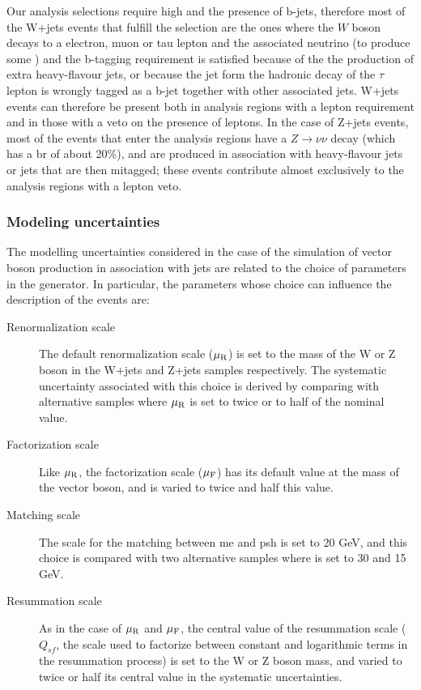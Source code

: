 Our analysis selections require high \met and the presence of b-jets, therefore most of the W+jets events that fulfill the selection are the ones where the $W$ boson decays to a electron, muon or tau lepton 
and the associated neutrino (to produce some \met) and the b-tagging requirement is satisfied because of the the production of extra heavy-flavour jets, or because the jet form the hadronic decay of the $\tau$
lepton is wrongly tagged as a b-jet together with other associated jets. 
W+jets events can therefore be present both in analysis regions with a lepton requirement and in those with a veto on the presence of leptons. 
In the case of Z+jets events, most of the events that enter the analysis regions have a $Z \to \nu \nu$ decay (which has a \gls{br} of about 20\%), and are produced in association with 
heavy-flavour jets or jets that are then mitagged; these events contribute almost exclusively to the analysis regions with a lepton veto. 

\subsubsection*{Modeling uncertainties}

The modelling uncertainties considered in the case of the simulation of vector boson production in association with jets are related to the choice of parameters in the \Sherpa generator. 
In particular, the parameters whose choice can influence the description of the events are:

\begin{description}
\item[Renormalization scale] The default renormalization scale ($\mu_{\rm{R}}$) is set to the mass of the W or Z boson in the W+jets and Z+jets samples respectively. 
The systematic uncertainty associated with this choice is derived by comparing with alternative samples where $\mu_{\rm{R}}$ is set to twice or to half of the nominal value. 

\item[Factorization scale] Like $\mu_{\rm{R}}$, the factorization scale ($\mu_{\rm{F}}$) has its default value at the mass of the vector boson, and is varied to twice and half this value.

\item[Matching scale] The scale for the matching between \gls{me} and \gls{psh} is set to 20 GeV, and this choice is compared with two alternative samples where is set to 30 and 15 GeV.

\item[Resummation scale] As in the case of $\mu_{\rm{R}}$ and $\mu_{\rm{F}}$, the central value of the resummation scale ($Q_{sf}$, the scale used to factorize between constant and logarithmic terms
in the resummation process) is set to the W or Z boson mass, and varied to twice or half its central value in the systematic uncertainties. 

\end{description}

